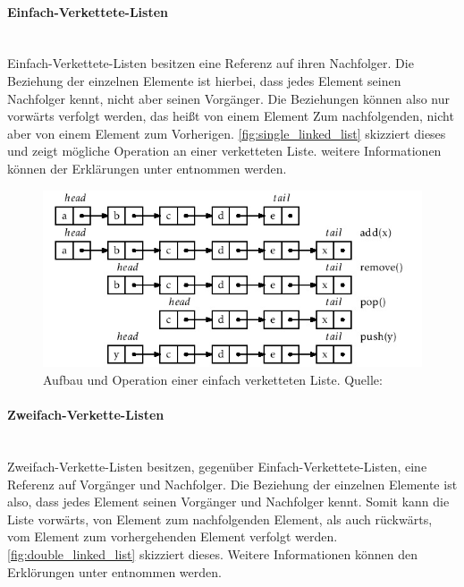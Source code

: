 \documentclass[a4paper]{article}
\begin{document}
	\paragraph{Einfach-Verkettete-Listen}\mbox{} \\
	
	Einfach-Verkettete-Listen besitzen eine Referenz auf ihren Nachfolger.
	Die Beziehung der einzelnen Elemente ist hierbei, dass jedes Element
	seinen Nachfolger kennt, nicht aber seinen Vorgänger. Die Beziehungen
	können also nur vorwärts verfolgt werden, das heißt von einem Element
	Zum nachfolgenden, nicht aber von einem Element zum Vorherigen.
	\autoref{fig:single_linked_list} skizziert dieses und zeigt mögliche
	Operation an einer verketteten Liste. weitere Informationen können
	der Erklärungen unter \cite{SLList} entnommen werden.
	
	\begin{figure}[H] 
		\includegraphics[width=\linewidth]{../Bilder/single_linked_list.jpg}
		\caption
		{
			Aufbau und Operation einer einfach verketteten Liste.
			Quelle: \cite{SLList}
		}
		\label{fig:single_linked_list}
	\end{figure}	
	
	\paragraph{Zweifach-Verkette-Listen}\mbox{} \\
	
	Zweifach-Verkette-Listen besitzen, gegenüber Einfach-Verkettete-Listen,
	eine Referenz auf Vorgänger und Nachfolger. Die Beziehung der einzelnen
	Elemente ist also, dass jedes Element seinen Vorgänger und Nachfolger
	kennt. Somit kann die Liste vorwärts, von Element zum nachfolgenden
	Element, als auch rückwärts, vom Element zum vorhergehenden Element
	verfolgt werden. \autoref{fig:double_linked_list} skizziert dieses.
	Weitere Informationen können den Erklörungen unter \cite{DLList} entnommen
	werden.
	
\end{document}
